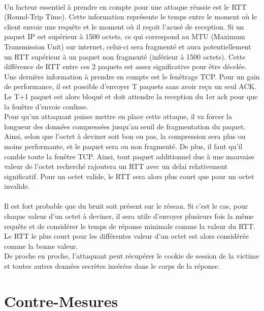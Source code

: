 \paragraph{}
Un facteur essentiel à prendre en compte pour une attaque réussie est le RTT (Round-Trip Time). Cette information représente le temps entre le moment où le client envoie une requête et le moment où il reçoit l'acusé de reception. Si un paquet IP est supérieur à 1500 octets, ce qui correspond au MTU (Maximum Transmission Unit) sur internet, celui-ci  sera fragmenté et aura potentiellement un RTT supérieur à un paquet non fragmenté (inférieur à 1500 octets). Cette différence de RTT entre ces 2 paquets est assez significative pour être décelée. Une dernière information à prendre en compte est le fenêtrage TCP. Pour un gain de performance, il est possible d'envoyer T paquets sans avoir reçu un seul ACK. Le T+1 paquet est alors bloqué et doit attendre la reception du 1er ack pour que la fenêtre d'envoie coulisse.\\

Pour qu'un attaquant puisse mettre en place cette attaque, il va forcer la longueur des données compressées jusqu'au seuil de fragmentation du paquet. Ainsi, selon que l'octet à deviner soit bon ou pas, la compression sera plus ou moins performante, et le paquet sera ou non fragmenté. De plus, il faut qu'il comble toute la fenêtre TCP. Ainsi, tout paquet additionnel due à une mauvaise valeur de l'octet recherché rajoutera un RTT avec un delai relativement significatif.
Pour un octet valide, le RTT sera alors plus court que pour un octet invalide.

\paragraph{}
Il est fort probable que du bruit soit présent sur le réseau. Si c'est le cas, pour chaque valeur d'un octet à deviner, il sera utile d'envoyer plusieurs fois la même requête et de considérer le temps de réponse minimale comme la valeur du RTT. Le RTT le plus court pour les différentes valeur d'un octet est alors considérée comme la bonne valeur.\\

De proche en proche, l'attaquant peut récupérer le cookie de session de la victime et toutes autres données secrètes insérées dans le corps de la réponse.

\section{Contre-Mesures}
